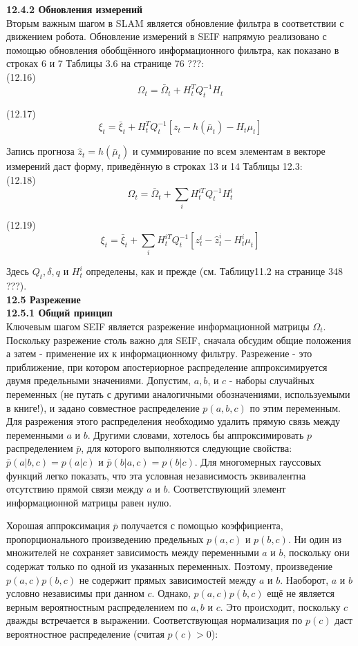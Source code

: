 \documentclass[10pt,a4paper]{article}
\begin{document}
\textbf{12.4.2	Обновления измерений}\\

Вторым важным шагом в SLAM является обновление фильтра в соответствии с движением робота. Обновление измерений в SEIF напрямую реализовано с помощью обновления обобщённого информационного фильтра, как показано в строках 6 и 7 Таблицы 3.6 на странице 76 ???:\\

(12.16)
$$\varOmega_t=\bar{\varOmega}_t+H_t^TQ_t^{-1}H_t$$

(12.17)
$$\xi_t=\bar{\xi}_t+H_t^TQ_t^{-1}[z_t-h(\bar{\mu}_t)-H_t\mu_t]$$

Запись прогноза $\hat{z}_t=h(\bar{\mu}_t)$ и суммирование по всем элементам в векторе измерений даст форму, приведённую в строках 13 и 14 Таблицы 12.3:\\

(12.18)
$$\varOmega_t=\bar{\varOmega}_t+\sum_iH_t^{iT}Q_t^{-1}H_t^i$$

(12.19)
$$\xi_t=\bar{\xi}_t+\sum_iH_t^{iT}Q_t^{-1}[z_t^i-\hat{z}_t^i-H_t^i\mu_t]$$

Здесь $Q_t,\delta,q$ и $H_t^i$ определены, как и прежде (см. Таблицу11.2 на странице 348 ???).\\

\textbf{12.5	Разрежение}\\

\textbf{12.5.1	Общий принцип}\\

Ключевым шагом SEIF является разрежение информационной матрицы $\varOmega_t$. Поскольку разрежение столь важно для SEIF, сначала обсудим общие положения а затем - применение их к информационному фильтру. Разрежение - это приближение, при котором апостериорное распределение аппроксимируется двумя предельными значениями. Допустим, $a, b$, и $c$ - наборы случайных переменных (не путать с другими аналогичными обозначениями, используемыми в книге!), и задано совместное распределение $p(a, b, c)$ по этим переменным. Для разрежения этого распределения необходимо удалить прямую связь между переменными $a$ и $b$. Другими словами, хотелось бы аппроксимировать $p$ распределением $\bar{p}$, для которого выполняются следующие свойства:  $\bar{p}(a|b,c)=p(a|c)$ и $\bar{p}(b|a,c)=p(b|c)$.  Для многомерных гауссовых функций легко показать, что эта условная независимость эквивалентна отсутствию прямой связи между $a$ и $b$. Соответствующий элемент информационной матрицы равен нулю.

Хорошая аппроксимация $\bar{p}$ получается с помощью коэффициента, пропорционального произведению предельных $p(a, c)$ и $p(b, c)$. Ни один из множителей не сохраняет зависимость между переменными $a$ и $b$, поскольку они содержат только по одной из указанных переменных. Поэтому, произведение $p(a, c) p(b, c)$ не содержит прямых зависимостей между $a$ и $b$. Наоборот, $a$ и $b$ условно независимы при данном $c$. Однако, $p(a, c) p(b, c)$ ещё не является верным вероятностным распределением по $a, b$ и $c$. Это происходит, поскольку $c$ дважды встречается в выражении. Соответствующая нормализация по $p(c)$ даст вероятностное распределение (считая $p(c)>0$):\\
\end{document}
